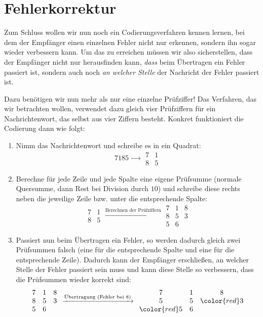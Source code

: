 \documentclass[a4paper,ngerman,12pt]{scrartcl}
\theoremstyle{definition}
\theoremstyle{plain}
\theoremstyle{remark}
\begin{document}
\newpage
\section{Fehlerkorrektur}

Zum Schluss wollen wir nun noch ein Codierungsverfahren kennen lernen, bei dem der Empfänger einen einzelnen Fehler nicht nur erkennen, sondern ihn sogar wieder verbessern kann. Um das zu erreichen müssen wir also sicherstellen, dass der Empfänger nicht nur herausfinden kann, \emph{dass} beim Übertragen ein Fehler passiert ist, sondern auch noch \emph{an welcher Stelle} der Nachricht der Fehler passiert ist.

Dazu benötigen wir nun mehr als nur eine einzelne Prüfziffer! Das Verfahren, das wir betrachten wollen, verwendet dazu gleich vier Prüfziffern für ein Nachrichtenwort, das selbst aus vier Ziffern besteht. Konkret funktioniert die Codierung dann wie folgt:

\begin{enumerate}
	\item Nimm das Nachrichtenwort und schreibe es in ein Quadrat:
		\[7185 \xrightarrow{\hspace{2em}} \begin{array}{cc}7 & 1 \\8 & 5\end{array}\]
	\item Berechne für jede Zeile und jede Spalte eine eigene Prüfsumme (normale Quersumme, dann Rest bei Division durch $10$) und schreibe diese rechts neben die jeweilige Zeile bzw. unter die entsprechende Spalte:
		\[\begin{array}{cc}7 & 1 \\8 & 5\end{array} \xrightarrow{\text{Berechnen der Prüfziffern}} \begin{array}{ccc}7 & 1 & 8\\8 & 5 & 3 \\ 5 & 6 &\end{array}\]
	\item Passiert nun beim Übertragen ein Fehler, so werden dadurch gleich zwei Prüfsummen falsch (eine für die entsprechende Spalte und eine für die entsprechende Zeile). Dadurch kann der Empfänger erschließen, an welcher Stelle der Fehler passiert sein muss und kann diese Stelle so verbessern, dass die Prüfsummen wieder korrekt sind:
		\[\begin{array}{ccc}7 & 1 & 8\\8 & 5 & 3 \\ 5 & 6 &\end{array} \xrightarrow{\text{Übertragung (Fehler bei 8)}} \begin{array}{ccc}7 & 1 & 8\\5 & 5 & {\color{red}3} \\ {\color{red}5} & 6 &\end{array}\]
\end{enumerate}
\end{document}
